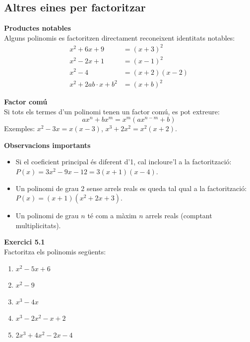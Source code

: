 \documentclass[12pt]{article}
\begin{document}
\subsection{Altres eines per factoritzar}

\begin{concept}
\textbf{Productes notables}\\
Alguns polinomis es factoritzen directament reconeixent identitats notables:
\begin{align*}
x^2 + 6x + 9 &= (x+3)^2 \\
x^2 - 2x + 1 &= (x-1)^2 \\
x^2 - 4 &= (x+2)(x-2) \\
x^2 + 2ab \cdot x + b^2 &= (x+b)^2
\end{align*}

\textbf{Factor comú}\\
Si tots els termes d'un polinomi tenen un factor comú, es pot extreure:
\[
a x^n + b x^m = x^m (a x^{n-m} + b)
\]
Exemples: $x^2-3x = x(x-3)$, \quad $x^3+2x^2 = x^2(x+2)$.
\end{concept}

\begin{concept}
\textbf{Observacions importants}
\begin{itemize}
    \item Si el coeficient principal és diferent d'1, cal incloure'l a la factorització: $P(x) = 3x^2-9x-12 = 3(x+1)(x-4)$.
    \item Un polinomi de grau 2 sense arrels reals es queda tal qual a la factorització: $P(x) = (x+1)(x^2+2x+3)$.
    \item Un polinomi de grau $n$ té com a màxim $n$ arrels reals (comptant multiplicitats).
\end{itemize}
\end{concept}

\begin{exercici}
\textbf{Exercici 5.1}\\
Factoritza els polinomis següents:
\begin{enumerate}[label=\alph*)]
    \item $x^2-5x+6$
    \item $x^2-9$
    \item $x^3-4x$
    \item $x^3-2x^2-x+2$
    \item $2x^3+4x^2-2x-4$
\end{enumerate}
\end{exercici}
\end{document}
